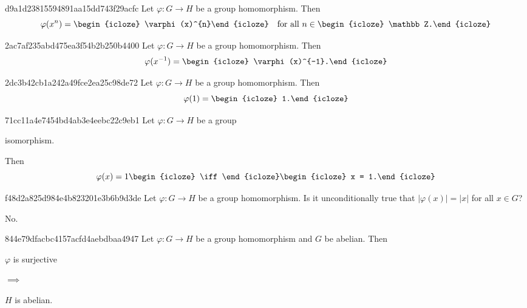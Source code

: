\begin{note}{d9a1d23815594891aa15dd743f29acfc}
    Let \({ \varphi : G \to H }\) be a group homomorphism.
    Then
    \[
        \varphi(x^{n}) = \begin{icloze}{1}\varphi(x)^{n}\end{icloze} \quad \text{for all } n \in \begin{icloze}{2}\mathbb Z.\end{icloze}
    \]
\end{note}

\begin{note}{2ac7af235abd475ea3f54b2b250b4400}
    Let \({ \varphi : G \to H }\) be a group homomorphism.
    Then
    \[
        \varphi(x^{-1}) = \begin{icloze}{1}\varphi(x)^{-1}.\end{icloze}
    \]
\end{note}

\begin{note}{2dc3b42cb1a242a49fce2ea25c98de72}
    Let \({ \varphi : G \to H }\) be a group homomorphism.
    Then
    \[
        \varphi(1) = \begin{icloze}{1}1.\end{icloze}
    \]
\end{note}

\begin{note}{71cc11a4e7454bd4ab3e4eebc22c9eb1}
    Let \({ \varphi : G \to H }\) be a group \begin{icloze}{3}isomorphism.\end{icloze}
    Then
    \[
        \varphi(x) = 1 \begin{icloze}{2}\iff\end{icloze} \begin{icloze}{1}x = 1.\end{icloze}
    \]
\end{note}

\begin{note}{f48d2a825d984e4b823201e3b6b9d3de}
    Let \({ \varphi : G \to H }\) be a group homomorphism.
    Is it unconditionally true that \({ \left\lvert \varphi(x) \right\rvert = \left\lvert x \right\rvert }\) for all \({ x \in G }\)?

    \begin{cloze}{1}
        No.
    \end{cloze}
\end{note}

\begin{note}{844e79dfacbc4157acfd4aebdbaa4947}
    Let \({ \varphi : G \to H }\) be a group homomorphism and \({ G }\) be abelian.
    Then
    \begin{center}
        \begin{icloze}{1}\({ \varphi }\) is surjective\end{icloze} \begin{icloze}{3}\({ \implies }\)\end{icloze} \begin{icloze}{2}\({ H }\) is abelian.\end{icloze}
    \end{center}
\end{note}

